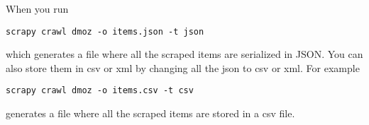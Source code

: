 When you run
\begin{lstlisting}
scrapy crawl dmoz -o items.json -t json
\end{lstlisting}
which generates a file  where all the scraped items are serialized in JSON. You can also store them in csv or xml by changing all the json to csv or xml.
For example
\begin{lstlisting}
scrapy crawl dmoz -o items.csv -t csv
\end{lstlisting}
generates a file  where all the scraped items are stored in a csv file.

\begin{comment}
To begin a project go to the directory where you want to store the code and run
\begin{lstlisting}
scrapy startproject <project name>
\end{lstlisting}
This will create several files. \li{scrapy.cfg} is a configuration file. It will create folder called \li{<project name>} , that contains files \li{items.py}, \li{pipelines.py}, \li{settings.py} and a directory called \li{spiders}. We will use all this files.

\section*{Items}
Items are like python dictionaries with some additional functionality. Go to the \texttt{items.py} found in the  \li{<project name>} directory. Items are labels for the data that you be storing.

\begin{lstlisting}
from scrapy.item import Item, Field

class <project name>Item(Item):
    <item1> = Field()
    <item2> = Field()
    <item3> = Field()
\end{lstlisting}

\section*{Spiders}
Spiders are classes used to scrape data from a group of websites. You will define classes that define the initial list of URLs to download, how to follow the links, and how to parse the contents of the pages into your items objects. There are two main spiders. \li{BaseSpider} and \li{CrawlSpider}. A BaseSpider is used for one website and a CrawlSpider used for crawling multiple websites.

We will start with a BaseSpider. Go in your spider directory and create a new file (the name of the file does not matter). Subcalss BaseSpider as shown below. A BaseSpider has three things. A name that is a unique identifier, \li{start_urls} which is a list of URLS from which the spider will begin to crawl from and parse(), a method which will be called with the Response object at the beginning of each url.


\end{comment}
